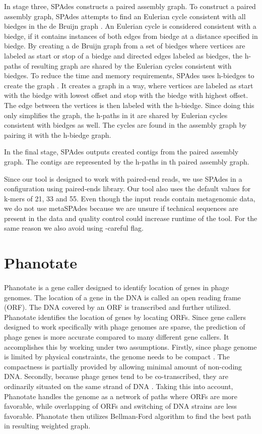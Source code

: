 In stage three, SPAdes constructs a paired assembly graph. To construct a paired assembly graph, SPAdes attempts to find an Eulerian cycle consistent with all biedges in the de Bruijn graph \cite{bankevich2012spades}. An Eulerian cycle is considered consistent with a biedge, if it contains instances of both edges from biedge at a distance specified in biedge. By creating a de Bruijn graph from a set of biedges where vertices are labeled as start or stop of a biedge and directed edges labeled as biedges, the h-paths of resulting graph are shared by the Eulerian cycles consistent with biedges. To reduce the time and memory requirements, SPAdes uses h-biedges to create the graph \cite{bankevich2012spades}. It creates a graph in a way, where vertices are labeled as start with the biedge with lowest offset and stop with the biedge with highest offset. The edge between the vertices is then labeled with the h-biedge. Since doing this only simplifies the graph, the h-paths in it are shared by Eulerian cycles consistent with biedges as well. The cycles are found in the assembly graph by pairing it with the h-biedge graph.

In the final stage, SPAdes outputs created contigs from the paired assembly graph. The contigs are represented by the h-paths in th paired assembly graph.

Since our tool is designed to work with paired-end reads, we use SPAdes in a configuration using paired-ends library. Our tool also uses the default values for k-mers of 21, 33 and 55. Even though the input reads contain metagenomic data, we do not use metaSPAdes because we are unsure if technical sequences are present in the data and quality control could increase runtime of the tool. For the same reason we also avoid using -careful flag.

\section{Phanotate}
\paragraph*{}
Phanotate\cite{mcnair2019phanotate} is a gene caller designed to identify location of genes in phage genomes. The location of a gene in the DNA is called an open reading frame (ORF). The DNA covered by an ORF is transcribed and further utilized. Phanotate identifies the location of genes by locating ORFs. Since gene callers designed to work specifically with phage genomes are sparse, the prediction of phage genes is more accurate compared to many different gene callers. It accomplishes this by working under two assumptions. Firstly, since phage genome is limited by physical constraints, the genome needs to be compact \cite{kang2017prophage}. The compactness is partially provided by allowing minimal amount of non-coding DNA. Secondly, because phage genes tend to be co-transcribed, they are ordinarily situated on the same strand of DNA \cite{akhter2012phispy}. Taking this into account, Phanotate handles the genome as a network of paths where ORFs are more favorable, while overlapping of ORFs and switching of DNA strains are less favorable. Phanotate then utilizes Bellman-Ford algorithm to find the best path in resulting weighted graph.

